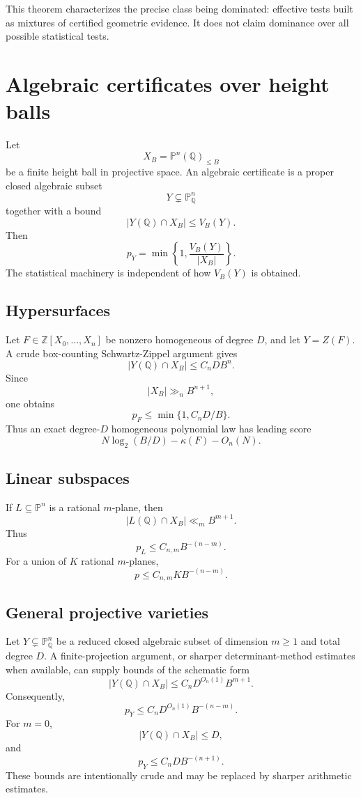\documentclass[11pt]{article}
\begin{document}
This theorem characterizes the precise class being dominated: effective tests built as mixtures of certified geometric evidence. It does not claim dominance over all possible statistical tests.

\section{Algebraic certificates over height balls}

Let
\[
X_B=\mathbb P^n(\mathbb Q)_{\le B}
\]
be a finite height ball in projective space. An algebraic certificate is a proper closed algebraic subset
\[
Y\subsetneq\mathbb P^n_{\mathbb Q}
\]
together with a bound
\[
|Y(\mathbb Q)\cap X_B|\le V_B(Y).
\]
Then
\[
p_Y=\min\left\{1,\frac{V_B(Y)}{|X_B|}\right\}.
\]
The statistical machinery is independent of how $V_B(Y)$ is obtained.

\subsection{Hypersurfaces}

Let $F\in\mathbb Z[X_0,\dots,X_n]$ be nonzero homogeneous of degree $D$, and let $Y=Z(F)$. A crude box-counting Schwartz-Zippel argument gives
\[
|Y(\mathbb Q)\cap X_B|\le C_nD B^n.
\]
Since
\[
|X_B|\gg_n B^{n+1},
\]
one obtains
\[
p_F\le \min\{1,C_nD/B\}.
\]
Thus an exact degree-$D$ homogeneous polynomial law has leading score
\[
N\log_2(B/D)-\kappa(F)-O_n(N).
\]

\subsection{Linear subspaces}

If $L\subseteq\mathbb P^n$ is a rational $m$-plane, then
\[
|L(\mathbb Q)\cap X_B|\ll_mB^{m+1}.
\]
Thus
\[
p_L\le C_{n,m}B^{-(n-m)}.
\]
For a union of $K$ rational $m$-planes,
\[
p\le C_{n,m}K B^{-(n-m)}.
\]

\subsection{General projective varieties}

Let $Y\subsetneq\mathbb P^n_{\mathbb Q}$ be a reduced closed algebraic subset of dimension $m\ge1$ and total degree $D$. A finite-projection argument, or sharper determinant-method estimates when available, can supply bounds of the schematic form
\[
|Y(\mathbb Q)\cap X_B|\le C_nD^{O_n(1)}B^{m+1}.
\]
Consequently,
\[
p_Y\le C_nD^{O_n(1)}B^{-(n-m)}.
\]
For $m=0$,
\[
|Y(\mathbb Q)\cap X_B|\le D,
\]
and
\[
p_Y\le C_nD B^{-(n+1)}.
\]
These bounds are intentionally crude and may be replaced by sharper arithmetic estimates.
\end{document}
